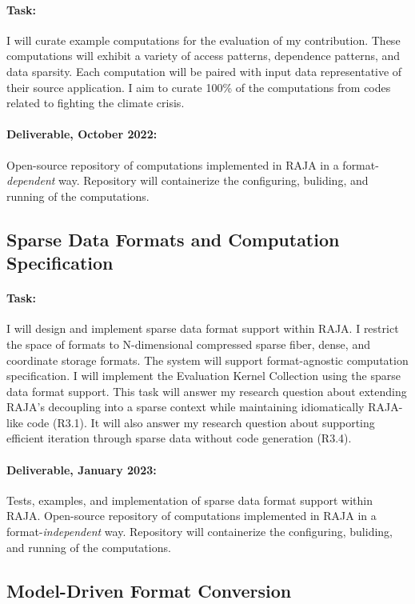\documentclass{article}
\begin{document}
\paragraph{Task:} I will curate example computations for the evaluation of my contribution.
These computations will exhibit a variety of access patterns, dependence patterns, and data sparsity.
Each computation will be paired with input data representative of their source application. 
I aim to curate 100\% of the computations from codes related to fighting the climate crisis.

\paragraph{Deliverable, October 2022:} Open-source repository of computations implemented in RAJA in a format-\textit{dependent} way. Repository will containerize the configuring, buliding, and running of the computations. 

\subsection{Sparse Data Formats and Computation Specification}
\paragraph{Task:} 
I will design and implement sparse data format support within RAJA. 
I restrict the space of formats to N-dimensional compressed sparse fiber, dense, and coordinate storage formats.
The system will support format-agnostic computation specification.
I will implement the Evaluation Kernel Collection using the sparse data format support.
This task will answer my research question about extending RAJA's decoupling into a sparse context while maintaining idiomatically RAJA-like code (R3.1).
It will also answer my research question about supporting efficient iteration through sparse data without code generation (R3.4). 

\paragraph{Deliverable, January 2023:} 
Tests, examples, and implementation of sparse data format support within RAJA. 
Open-source repository of computations implemented in RAJA in a format-\textit{independent} way.
Repository will containerize the configuring, buliding, and running of the computations. 

\subsection{Model-Driven Format Conversion}
\end{document}
